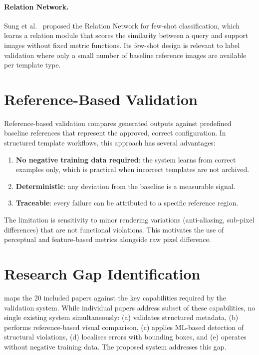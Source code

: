 \paragraph{Relation Network.}
Sung et al.~\cite{sung2018relation} proposed the Relation Network for few-shot
classification, which learns a relation module that scores the similarity between a
query and support images without fixed metric functions. Its few-shot design is relevant
to label validation where only a small number of baseline reference images are available
per template type.

\section{Reference-Based Validation}
\label{sec:ref_validation}

Reference-based validation compares generated outputs against predefined baseline
references that represent the approved, correct configuration. In structured template
workflows, this approach has several advantages:

\begin{enumerate}
  \item \textbf{No negative training data required}: the system learns from correct
  examples only, which is practical when incorrect templates are not archived.
  \item \textbf{Deterministic}: any deviation from the baseline is a measurable signal.
  \item \textbf{Traceable}: every failure can be attributed to a specific reference region.
\end{enumerate}

The limitation is sensitivity to minor rendering variations (anti-aliasing, sub-pixel
differences) that are not functional violations. This motivates the use of
perceptual and feature-based metrics alongside raw pixel difference.

\section{Research Gap Identification}
\label{sec:gap}

 maps the 20 included papers against the key capabilities required by
the validation system. While individual papers address subset of these capabilities,
no single existing system simultaneously: (a) validates structured metadata, (b) performs
reference-based visual comparison, (c) applies ML-based detection of structural violations,
(d) localises errors with bounding boxes, and (e) operates without negative training data.
The proposed system addresses this gap.

